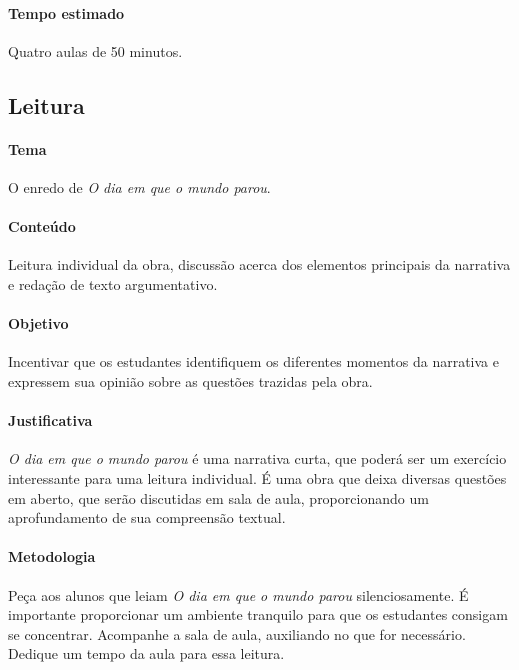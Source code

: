 \documentclass[11pt]{extarticle}
\begin{document}
\paragraph{Tempo estimado} Quatro aulas de 50 minutos.

\subsection{Leitura}


\paragraph{Tema} O enredo de \textit{O dia em que o mundo parou}.

\paragraph{Conteúdo} Leitura individual da obra, discussão acerca dos elementos principais da narrativa e redação de texto argumentativo.

\paragraph{Objetivo} Incentivar que os estudantes identifiquem os diferentes momentos da narrativa e expressem sua opinião sobre as questões trazidas pela obra.


\paragraph{Justificativa} \textit{O dia em que o mundo parou} é uma narrativa curta, que poderá ser um exercício interessante para uma leitura individual. É uma obra que deixa diversas questões em aberto, que serão discutidas em sala de aula, proporcionando um aprofundamento de sua compreensão textual.

\paragraph{Metodologia} Peça aos alunos que leiam \textit{O dia em que o mundo parou} silenciosamente. É importante proporcionar um ambiente tranquilo para que os estudantes consigam se concentrar. Acompanhe a sala de aula, auxiliando no que for necessário. Dedique um tempo da aula para essa leitura.
\end{document}
